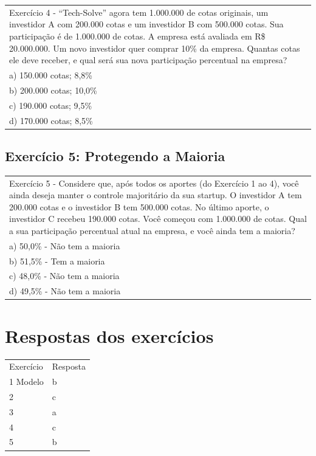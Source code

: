 \documentclass[
]{book}
\begin{document}
\begin{longtable}[]{@{}
  >{\raggedright\arraybackslash}p{}@{}}
\toprule\noalign{}
\endhead
\bottomrule\noalign{}
\endlastfoot
Exercício 4 - ``Tech-Solve'' agora tem 1.000.000 de cotas originais, um investidor A com 200.000 cotas e um investidor B com 500.000 cotas. Sua participação é de 1.000.000 de cotas. A empresa está avaliada em R\$ 20.000.000. Um novo investidor quer comprar 10\% da empresa. Quantas cotas ele deve receber, e qual será sua nova participação percentual na empresa? \\
a) 150.000 cotas; 8,8\% \\
b) 200.000 cotas; 10,0\% \\
c) 190.000 cotas; 9,5\% \\
d) 170.000 cotas; 8,5\% \\
\end{longtable}

\subsection{Exercício 5: Protegendo a Maioria}\label{exercuxedcio-5-protegendo-a-maioria}

\begin{longtable}[]{@{}
  >{\raggedright\arraybackslash}p{}@{}}
\toprule\noalign{}
\endhead
\bottomrule\noalign{}
\endlastfoot
Exercício 5 - Considere que, após todos os aportes (do Exercício 1 ao 4), você ainda deseja manter o controle majoritário da sua startup. O investidor A tem 200.000 cotas e o investidor B tem 500.000 cotas. No último aporte, o investidor C recebeu 190.000 cotas. Você começou com 1.000.000 de cotas. Qual a sua participação percentual atual na empresa, e você ainda tem a maioria? \\
a) 50,0\% - Não tem a maioria \\
b) 51,5\% - Tem a maioria \\
c) 48,0\% - Não tem a maioria \\
d) 49,5\% - Não tem a maioria \\
\end{longtable}

\section{Respostas dos exercícios}\label{respostas-dos-exercuxedcios}

\begin{longtable}[]{@{}ll@{}}
\toprule\noalign{}
\endhead
\bottomrule\noalign{}
\endlastfoot
Exercício & Resposta \\
1 Modelo & b \\
2 & c \\
3 & a \\
4 & c \\
5 & b \\
\end{longtable}
\end{document}
